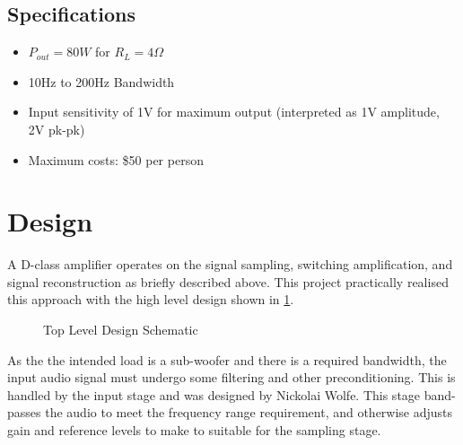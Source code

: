 \documentclass[11pt]{article}
\begin{document}
{\subsection*{Specifications}\label{S:spec}
\begin{itemize}
  \item $P_{out}=80W$ for $R_{L} = 4\Omega$
  \item 10Hz to 200Hz Bandwidth
  \item Input sensitivity of 1V for maximum output (interpreted as 1V amplitude, 2V pk-pk)
  \item Maximum costs: \$50 per person
\end{itemize}

\section{Design}

A D-class amplifier operates on the signal sampling, switching amplification, and signal reconstruction as briefly described above. This project practically realised this approach with the high level design shown in \cref{F:top_schem}. 

\begin{figure}[h!]
  \centering
    \caption{Top Level Design Schematic}
  \label{F:top_schem}
\end{figure}

As the the intended load is a sub-woofer and there is a required bandwidth, the input audio signal must undergo some filtering and other preconditioning. This is handled by the input stage and was designed by Nickolai Wolfe. This stage band-passes the audio to meet the frequency range requirement, and otherwise adjusts gain and reference levels to make to suitable for the sampling stage.

}
\end{document}

